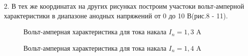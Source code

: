 \documentclass[a4paper,12pt]{article}
\begin{document}
\par 2. В тех же координатах на других рисунках построим участоки вольт-амперной характеристики в диапазоне анодных напряжений от 0 до 10 В(рис.8 - 11). 

\begin{figure} 
	\centering
	\caption{Вольт-амперная характеристика для тока накала $I_n = 1,3$ A}
	\label{mah}
\end{figure}

\begin{figure} 
	\centering
	\caption{Вольт-амперная характеристика для тока накала $I_n = 1,4$ A}
	\label{mah}
\end{figure}
\end{document}
